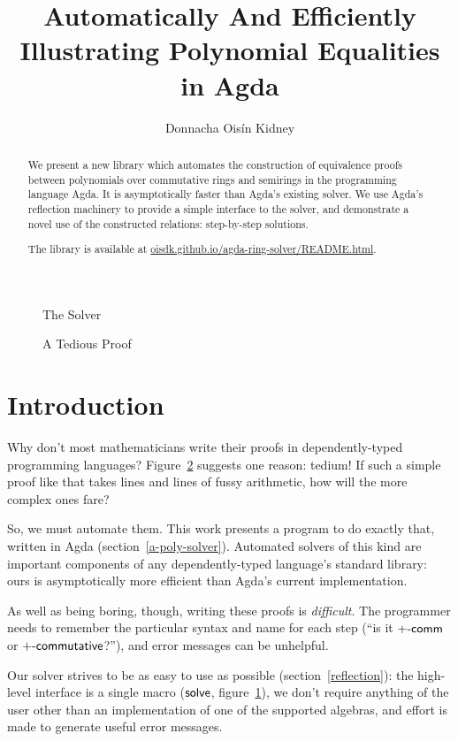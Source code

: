 \documentclass[draft, twocolumn]{article}
\author{Donnacha Oisín Kidney}
\title{Automatically And Efficiently Illustrating Polynomial Equalities in Agda}
\theoremstyle{definition}
\theoremstyle{definition}
\begin{document}
\maketitle
\begin{figure}
  \caption{The Solver}
  \label{the-solver}
\end{figure}
\begin{figure}
  \centering
  \caption{A Tedious Proof}
  \label{ring-proof}
\end{figure}
\begin{abstract}
  We present a new library which automates the construction of equivalence
  proofs between polynomials over commutative rings and semirings in the
  programming language Agda\cite{norell_dependently_2008}. It is asymptotically
  faster than Agda's existing solver. We use Agda's reflection machinery to
  provide a simple interface to the solver, and demonstrate a novel use of the
  constructed relations: step-by-step solutions.

  The library is available at
  \href{https://oisdk.github.io/agda-ring-solver/README.html}{oisdk.github.io/agda-ring-solver/README.html}.
\end{abstract}
\tableofcontents
\section{Introduction}
Why don't most mathematicians write their proofs in dependently-typed
programming languages? Figure~\ref{ring-proof} suggests one reason: tedium!
If such a simple proof like that takes lines and lines of fussy arithmetic, how
will the more complex ones fare? 

So, we must automate them. This work presents a program to do exactly that,
written in Agda (section~\ref{a-poly-solver}). Automated solvers of this kind
are important components of any dependently-typed language's standard library:
ours is asymptotically more efficient than Agda's current implementation. 

As well as being boring, though, writing these proofs is \emph{difficult}. The
programmer needs to remember the particular syntax and name for each step (``is
it \(\AgdaFunction{+-comm}\) or \(\AgdaFunction{+-commutative}\)?''), and error
messages can be unhelpful.

Our solver strives to be as easy to use as possible (section~\ref{reflection}):
the high-level interface is a single macro (\(\AgdaMacro{solve}\),
figure~\ref{the-solver}), we don't require anything of the user other than an
implementation of one of the supported algebras, and effort is made to generate
useful error messages.
\end{document}
